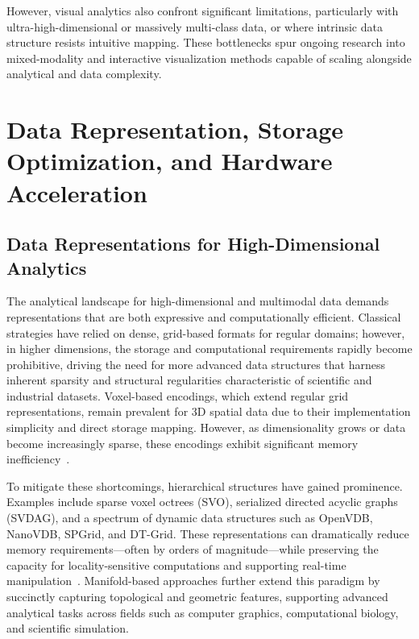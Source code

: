 However, visual analytics also confront significant limitations, particularly with ultra-high-dimensional or massively multi-class data, or where intrinsic data structure resists intuitive mapping. These bottlenecks spur ongoing research into mixed-modality and interactive visualization methods capable of scaling alongside analytical and data complexity.

\section{Data Representation, Storage Optimization, and Hardware Acceleration}
\label{sec:data-representation-optimization}

\subsection{Data Representations for High-Dimensional Analytics}

The analytical landscape for high-dimensional and multimodal data demands representations that are both expressive and computationally efficient. Classical strategies have relied on dense, grid-based formats for regular domains; however, in higher dimensions, the storage and computational requirements rapidly become prohibitive, driving the need for more advanced data structures that harness inherent sparsity and structural regularities characteristic of scientific and industrial datasets. Voxel-based encodings, which extend regular grid representations, remain prevalent for 3D spatial data due to their implementation simplicity and direct storage mapping. However, as dimensionality grows or data become increasingly sparse, these encodings exhibit significant memory inefficiency~\cite{ref86}.

To mitigate these shortcomings, hierarchical structures have gained prominence. Examples include sparse voxel octrees (SVO), serialized directed acyclic graphs (SVDAG), and a spectrum of dynamic data structures such as OpenVDB, NanoVDB, SPGrid, and DT-Grid. These representations can dramatically reduce memory requirements---often by orders of magnitude---while preserving the capacity for locality-sensitive computations and supporting real-time manipulation~\cite{ref86}. Manifold-based approaches further extend this paradigm by succinctly capturing topological and geometric features, supporting advanced analytical tasks across fields such as computer graphics, computational biology, and scientific simulation.

